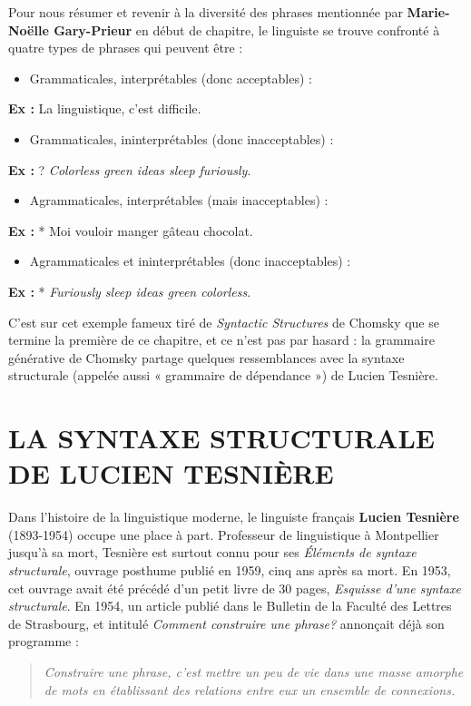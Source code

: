 Pour nous résumer et revenir à la diversité des phrases mentionnée par \textbf{Marie-Noëlle Gary-Prieur} en début de chapitre, le linguiste se trouve confronté à quatre types de phrases qui peuvent être :
\begin{itemize}
\item Grammaticales, interprétables (donc acceptables) :
\end{itemize}
\noindent\textbf{Ex :} La linguistique, c’est difficile.
\begin{itemize}
\item Grammaticales, ininterprétables (donc inacceptables) :
\end{itemize}
\noindent\textbf{Ex :} ? \textit{Colorless green ideas sleep furiously}.
\begin{itemize}
\item Agrammaticales, interprétables (mais inacceptables) :
\end{itemize}
\noindent\textbf{Ex :} * Moi vouloir manger gâteau chocolat.
\begin{itemize}
\item Agrammaticales et ininterprétables (donc inacceptables) :
\end{itemize}
\noindent\textbf{Ex :} * \textit{Furiously sleep ideas green colorless}.

C’est sur cet exemple fameux tiré de \textit{Syntactic Structures} de Chomsky que se termine la première de ce chapitre, et ce n’est pas par hasard : la grammaire générative de Chomsky partage quelques ressemblances avec la syntaxe structurale (appelée aussi « grammaire de dépendance ») de Lucien Tesnière.

\section{LA SYNTAXE STRUCTURALE DE LUCIEN TESNIÈRE}
Dans l’histoire de la linguistique moderne, le linguiste français \textbf{Lucien Tesnière} (1893-1954) occupe une place à part. Professeur de linguistique à Montpellier jusqu’à sa mort, Tesnière est surtout connu pour ses \textit{Éléments de syntaxe structurale}, ouvrage posthume publié en 1959, cinq ans après sa mort. En 1953, cet ouvrage avait été précédé d’un petit livre de 30 pages, \textit{Esquisse d’une syntaxe structurale}. En 1954, un article publié dans le Bulletin de la Faculté des Lettres de Strasbourg, et intitulé \textit{Comment construire une phrase?} annonçait déjà son programme :
\begin{quote}\small\itshape
Construire une phrase, c’est mettre un peu de vie dans une masse amorphe de mots en établissant des relations entre eux un ensemble de connexions.
\end{quote}

